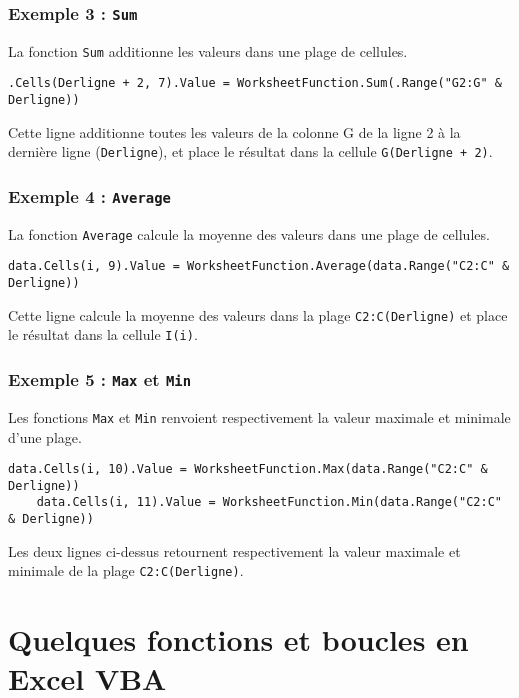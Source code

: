 \documentclass[a4paper,12pt]{report}
\begin{document}
\subsection{Exemple 3 : \texttt{Sum}}
La fonction \texttt{Sum} additionne les valeurs dans une plage de cellules.

\begin{lstlisting}[language=VBScript]
	.Cells(Derligne + 2, 7).Value = WorksheetFunction.Sum(.Range("G2:G" & Derligne))
\end{lstlisting}

Cette ligne additionne toutes les valeurs de la colonne G de la ligne 2 à la dernière ligne (\texttt{Derligne}), et place le résultat dans la cellule \texttt{G(Derligne + 2)}.

\subsection{Exemple 4 : \texttt{Average}}
La fonction \texttt{Average} calcule la moyenne des valeurs dans une plage de cellules.

\begin{lstlisting}[language=VBScript]
	data.Cells(i, 9).Value = WorksheetFunction.Average(data.Range("C2:C" & Derligne))
\end{lstlisting}

Cette ligne calcule la moyenne des valeurs dans la plage \texttt{C2:C(Derligne)} et place le résultat dans la cellule \texttt{I(i)}.

\subsection{Exemple 5 : \texttt{Max} et \texttt{Min}}
Les fonctions \texttt{Max} et \texttt{Min} renvoient respectivement la valeur maximale et minimale d'une plage.

\begin{lstlisting}[language=VBScript]
	data.Cells(i, 10).Value = WorksheetFunction.Max(data.Range("C2:C" & Derligne))
	data.Cells(i, 11).Value = WorksheetFunction.Min(data.Range("C2:C" & Derligne))
\end{lstlisting}

Les deux lignes ci-dessus retournent respectivement la valeur maximale et minimale de la plage \texttt{C2:C(Derligne)}.


\chapter{Quelques fonctions et boucles en Excel VBA}
\end{document}
